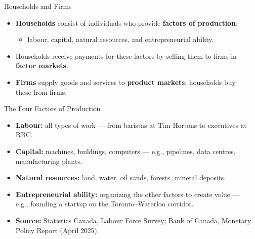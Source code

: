 \documentclass[aspectratio=169]{beamer}
\begin{document}
\begin{frame}{Households and Firms}
\transfade
\begin{itemize}[<+->]
  \item \textbf{Households} consist of individuals who provide \textbf{factors of production}:
  \begin{itemize}[<+->]
    \item labour, capital, natural resources, and entrepreneurial ability.
  \end{itemize}
  \item Households receive payments for these factors by selling them to firms in \textbf{factor markets}.
  \item \textbf{Firms} supply goods and services to \textbf{product markets}; households buy these from firms.
\end{itemize}
\end{frame}

\begin{frame}{The Four Factors of Production}
\transfade
\begin{itemize}[<+->]
  \item \textbf{Labour:} all types of work --- from baristas at Tim Hortons to executives at RBC.
  \item \textbf{Capital:} machines, buildings, computers --- e.g., pipelines, data centres, manufacturing plants.
  \item \textbf{Natural resources:} land, water, oil sands, forests, mineral deposits.
  \item \textbf{Entrepreneurial ability:} organizing the other factors to create value --- e.g., founding a startup on the Toronto--Waterloo corridor.
  \item \textbf{Source:} Statistics Canada, Labour Force Survey; Bank of Canada, Monetary Policy Report (April 2025).
\end{itemize}
\end{frame}
\end{document}
